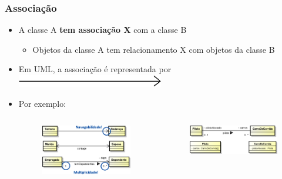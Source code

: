 \documentclass[aspectratio=169]{beamer}
\begin{document}
\begin{frame}\frametitle{Associação}
\begin{itemize}
	\item A classe A \textbf{tem associação X} com a classe B
	\begin{itemize}
		\item Objetos da classe A tem relacionamento X com objetos da classe B
	\end{itemize}
	\item Em UML, a associação é representada por \includegraphics[height=0.025\paperheight]{imagens/associacao0.png}
	\item Por exemplo:
\begin{columns}
\begin{column}{0.5\linewidth}
	\begin{figure}[h]
		\includegraphics[height=0.4\paperheight]{imagens/associacao1.png}
	\end{figure}
\end{column}
\begin{column}{0.5\linewidth}
	\begin{figure}[h]
		\includegraphics[height=0.25\paperheight]{imagens/associacao2.png}
	\end{figure}
\end{column}
\end{columns}
\end{itemize}
\end{frame}
\end{document}
